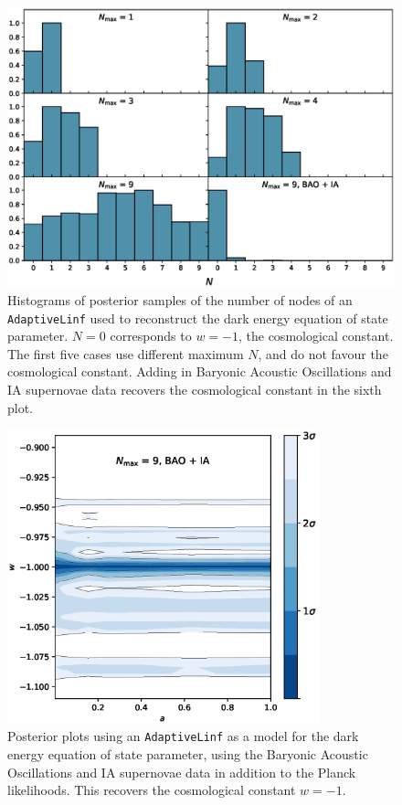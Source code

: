 \documentclass{article}
\begin{document}
\begin{figure}[H]
  \centering
  \includegraphics[width=13cm]{darkN.eps}
  \caption{Histograms of posterior samples of the number of nodes of an \texttt{AdaptiveLinf} used to reconstruct the dark energy equation of state parameter. $N=0$ corresponds to $w=-1$, the cosmological constant. The first five cases use different maximum $N$, and do not favour the cosmological constant. Adding in Baryonic Acoustic Oscillations and IA supernovae data recovers the cosmological constant in the sixth plot.}
  \label{fig:darkN}
\end{figure}

\begin{figure}[H]
  \centering
  \includegraphics[width=9cm]{darkNbao.eps}
  \caption{Posterior plots using an \texttt{AdaptiveLinf} as a model for the dark energy equation of state parameter, using the Baryonic Acoustic Oscillations and IA supernovae data in addition to the Planck likelihoods. This recovers the cosmological constant $w=-1$.}
  \label{fig:darkNbao}
\end{figure}
\end{document}
